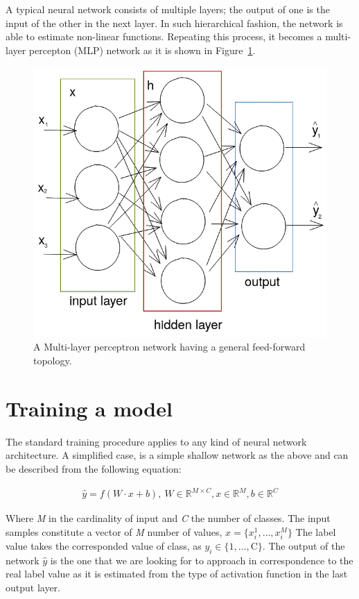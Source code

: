A typical neural network consists of multiple layers; the output of one is the input of the other in the next layer. In such hierarchical fashion, the network is able to estimate non-linear functions. 
Repeating this process, it becomes a multi-layer percepton (MLP) network as it is shown in Figure~\ref{c3:mlp}.

\begin{figure}[h!]
    \centering  
    \includegraphics[width=.5\textwidth]{figures/chap3/ml/mlp}
    \caption{A Multi-layer perceptron network having a general feed-forward topology.}
    \label{c3:mlp}
\end{figure}


\section{Training a model}

The standard training procedure applies to any kind of neural network architecture. A simplified case, is a simple shallow network as the above and can be described from the following equation:

\begin{ceqn}
\label{c3:perceptron_mlp_equation}
\begin{align}
    \hat{y} = f(W \cdot x + b),~ W \in \mathbb{R}^{M\times C}, x \in \mathbb{R}^{M}, b \in \mathbb{R}^{C}
\end{align}
\end{ceqn}


Where \textit{M} in the cardinality of input and \textit{C} the number of classes. The input samples constitute a vector of \textit{M} number of values, $x = \{x_{i}^{1}, \dots, x_{i}^{M} \}$
The label value takes the corresponded value of class, as $y_i \in \{ 1, \dots,\text{C} \}$. The output of the network $\hat{y}$ is the one that we are looking for to approach in correspondence to the real label value as it is estimated from the type of activation function in the last output layer.


